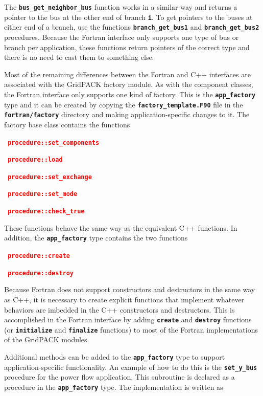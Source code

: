 \documentclass[12pt]{report} %
\begin{document}
The \texttt{\textbf{bus\_get\_neighbor\_bus}} function works in a similar way and returns a pointer to the bus at the other end of branch \texttt{\textbf{i}}. To get pointers to the buses at either end of a branch, use the functions \texttt{\textbf{branch\_get\_bus1}} and \texttt{\textbf{branch\_get\_bus2}} procedures. Because the Fortran interface only supports one type of bus or branch per application, these functions return pointers of the correct type and there is no need to cast them to something else.

Most of the remaining differences between the Fortran and C++ interfaces are associated with the GridPACK factory module. As with the component classes, the Fortran interface only supports one kind of factory. This is the \texttt{\textbf{app\_factory}} type and it can be created by copying the \texttt{\textbf{factory\_template.F90}} file in the \texttt{\textbf{fortran/factory}} directory and making application-specific changes to it. The factory base class contains the functions

\textcolor{red}{\texttt{\textbf{    procedure::set\_components}}}

\textcolor{red}{\texttt{\textbf{    procedure::load}}}

\textcolor{red}{\texttt{\textbf{    procedure::set\_exchange}}}

\textcolor{red}{\texttt{\textbf{    procedure::set\_mode}}}

\textcolor{red}{\texttt{\textbf{    procedure::check\_true}}}

These functions behave the same way as the equivalent C++ functions. In addition, the \texttt{\textbf{app\_factory}} type contains the two functions

\textcolor{red}{\texttt{\textbf{    procedure::create}}}

\textcolor{red}{\texttt{\textbf{    procedure::destroy}}}

Because Fortran does not support constructors and destructors in the same way as C++, it is necessary to create explicit functions that implement whatever behaviors are imbedded in the C++ constructors and destructors. This is accomplished in the Fortran interface by adding \texttt{\textbf{create}} and \texttt{\textbf{destroy}} functions (or \texttt{\textbf{initialize}} and \texttt{\textbf{finalize}} functions) to most of the Fortran implementations of the GridPACK modules.

Additional methods can be added to the \texttt{\textbf{app\_factory}} type to support application-specific functionality. An example of how to do this is the \texttt{\textbf{set\_y\_bus}} procedure for the power flow application. This subroutine is declared as a procedure in the \texttt{\textbf{app\_factory}} type. The implementation is written as
\end{document}
